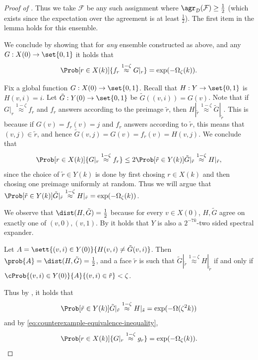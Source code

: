 \begin{proof}[Proof of ]
Thus we take \(\mathcal{F}\) be any such assignment where \(\agr_{\mathcal{D}}(\mathcal{F}) \geq \frac{1}{2}\) (which exists since the expectation over the agreement is at least \(\frac{1}{2}\)). The first item in the lemma holds for this ensemble.

\medskip

We conclude by showing that for \emph{any} ensemble constructed as above, and any \(G:X(0) \to \set{0,1}\) it holds that 
\[\Prob[r \in X(k)]{f_r \overset{1-\zeta}{\approx} G|_r} =\exp(-\Omega_\zeta(k)).\]

Fix a global function \(G:X(0) \to \set{0,1}\). Recall that \(H:Y \to \set{0,1}\) is \(H(v,i)=i\). Let \(\tilde{G}:Y(0) \to \set{0,1}\) be \(\tilde{G}((v,i))=G(v)\). Note that if \(G|_r \overset{1-\zeta}{\approx} f_r\) and \(f_r\) answers according to the preimage \(\tilde{r}\), then \(H|_{\tilde{r}} \overset{1-\zeta}{\approx} \tilde{G}|_{\tilde{r}}\). This is because if \(G(v)=f_r(v)=j\) and \(f_r\) answers according to \(\tilde{r}\), this means that \((v,j) \in \tilde{r}\), and hence \(\tilde{G}(v,j)=G(v)=f_r(v)=H(v,j)\). We conclude that
\begin{equation} \label{eq:counterexample-equivalence-inequality}
    \Prob[r \in X(k)]{G|_r \overset{1-\zeta}{\approx} f_r} \leq 2\Prob[\tilde{r} \in Y(k)]{\tilde{G}|_{\tilde{r}} \overset{1-\zeta}{\approx} H|_{\tilde{r}}},
\end{equation}
since the choice of \(\tilde{r} \in Y(k)\) is done by first chosing \(r \in X(k)\) and then chosing one preimage uniformly at random. Thus we will argue that \(\Prob[\tilde{r} \in Y(k)]{\tilde{G}|_{\tilde{r}} \overset{1-\zeta}{\approx} H|_{\tilde{r}}} = \exp(-\Omega_\zeta(k))\).

We observe that \(\dist(H,\tilde{G})=\frac{1}{2}\) because for every \(v \in X(0)\), \(H,\tilde{G}\) agree on exactly one of \((v,0),(v,1)\). By  it holds that \(Y\) is also a \(2^{-7k}\)-two sided spectral expander. 

Let \(A = \sett{(v,i) \in Y(0)}{H(v,i) \ne \tilde{G}(v,i)}\). Then \(\prob{A} = \dist(H,\tilde{G})=\frac{1}{2}\), and a face \(\tilde{r}\) is such that \(\tilde{G}|_{\tilde{r}} \overset{1-\zeta}{\approx} H|_{\tilde{r}}\) if and only if \(\cProb{(v,i)\in Y(0)}{A}{(v,i) \in \tilde{r}} < \zeta\).

Thus by , it holds that 
\[\Prob[\tilde{r} \in Y(k)]{\tilde{G}|_{\tilde{r}} \overset{1-\zeta}{\approx} H|_{\tilde{s}} } = \exp(-\Omega(\zeta^2 k))\]
and by \eqref{eq:counterexample-equivalence-inequality}, 
\[\Prob[r \in X(k)]{G|_r \overset{1-\zeta}{\approx} g_r} = \exp(-\Omega_\zeta( k )).\]    
\end{proof}

